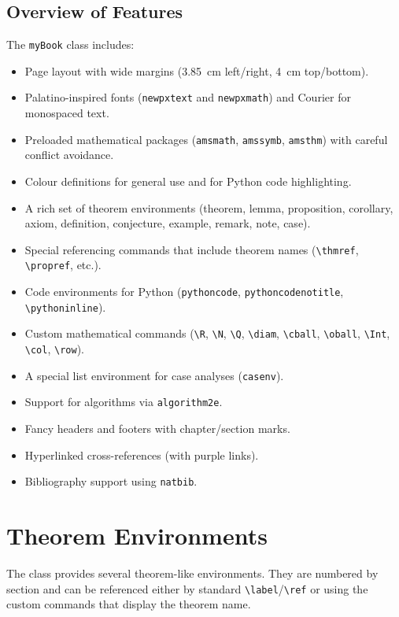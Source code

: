 \documentclass{myBook}
\begin{document}
\section{Overview of Features}
The \texttt{myBook} class includes:
\begin{itemize}
    \item Page layout with wide margins (3.85~cm left/right, 4~cm top/bottom).
    \item Palatino-inspired fonts (\texttt{newpxtext} and \texttt{newpxmath}) and Courier for monospaced text.
    \item Preloaded mathematical packages (\texttt{amsmath}, \texttt{amssymb}, \texttt{amsthm}) with careful conflict avoidance.
    \item Colour definitions for general use and for Python code highlighting.
    \item A rich set of theorem environments (theorem, lemma, proposition, corollary, axiom, definition, conjecture, example, remark, note, case).
    \item Special referencing commands that include theorem names (\texttt{\textbackslash thmref}, \texttt{\textbackslash propref}, etc.).
    \item Code environments for Python (\texttt{pythoncode}, \texttt{pythoncodenotitle}, \texttt{\textbackslash pythoninline}).
    \item Custom mathematical commands (\texttt{\textbackslash R}, \texttt{\textbackslash N}, \texttt{\textbackslash Q}, \texttt{\textbackslash diam}, \texttt{\textbackslash cball}, \texttt{\textbackslash oball}, \texttt{\textbackslash Int}, \texttt{\textbackslash col}, \texttt{\textbackslash row}).
    \item A special list environment for case analyses (\texttt{casenv}).
    \item Support for algorithms via \texttt{algorithm2e}.
    \item Fancy headers and footers with chapter/section marks.
    \item Hyperlinked cross-references (with purple links).
    \item Bibliography support using \texttt{natbib}.
\end{itemize}

\chapter{Theorem Environments}
The class provides several theorem-like environments. They are numbered by section and can be referenced either by standard \texttt{\textbackslash label}/\texttt{\textbackslash ref} or using the custom commands that display the theorem name.
\end{document}
